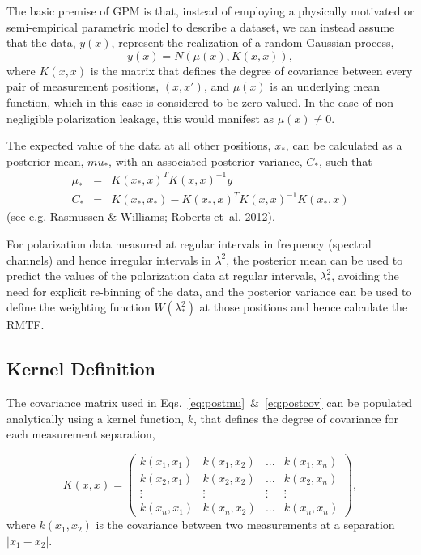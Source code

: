 \documentclass[fleqn,usenatbib]{mnras}
\begin{document}
The basic premise of GPM is that, instead of employing a physically motivated or semi-empirical parametric model to describe a dataset, we can instead assume that the data, $y(x)$, represent the realization of a random Gaussian process,
%
\begin{equation}
y(x) = N(\mu(x), K(x,x)),
\end{equation}
%
where $K(x,x)$ is the matrix that defines the degree of covariance between every pair of measurement positions, $(x,x')$, and $\mu(x)$ is an underlying mean function, which in this case is considered to be zero-valued. In the case of non-negligible polarization leakage, this would manifest as $\mu(x)\neq 0$.

The expected value of the data at all other positions, $x_{\ast}$, can be calculated as a posterior mean, $mu_{\ast}$, with an associated posterior variance, $C_{\ast}$, such that
%
\begin{eqnarray}
\label{eq:postmu} \mu_{\ast} &=&  K(x_{\ast},x)^T K(x,x)^{-1} y  \\
\label{eq:postcov} C_{\ast} &=&  K(x_{\ast},x_{\ast}) - K(x_{\ast},x)^T K(x,x)^{-1} K(x_{\ast},x) 
\end{eqnarray}
%
(see e.g. Rasmussen \& Williams; Roberts et~al. 2012).

For polarization data measured at regular intervals in frequency (spectral channels) and hence irregular intervals in $\lambda^2$, the posterior mean can be used to predict the values of the polarization data at regular intervals, $\lambda_{\ast}^2$, avoiding the need for explicit re-binning of the data, and the posterior variance can be used to define the weighting function $W(\lambda_{\ast}^2)$ at those positions and hence calculate the RMTF. 

\subsection{Kernel Definition}
\label{sec:kernels} 

The covariance matrix used in Eqs.~\ref{eq:postmu}~\&~\ref{eq:postcov} can be populated analytically using a kernel function, $k$, that defines the degree of covariance for each measurement separation,

\begin{equation}
K(x,x) = \left(
\begin{array}{cccc}
k(x_1,x_1) & k(x_1,x_2) & ... & k(x_1,x_n) \\
k(x_2,x_1) & k(x_2,x_2) & ... & k(x_2,x_n) \\
\vdots & \vdots & \vdots & \vdots \\
k(x_n,x_1) & k(x_n,x_2) & ... & k(x_n,x_n) 
\end{array}
\right),
\end{equation}
%
where $k(x_1,x_2)$ is the covariance between two measurements at a separation $|x_1 - x_2|$.
\end{document}
